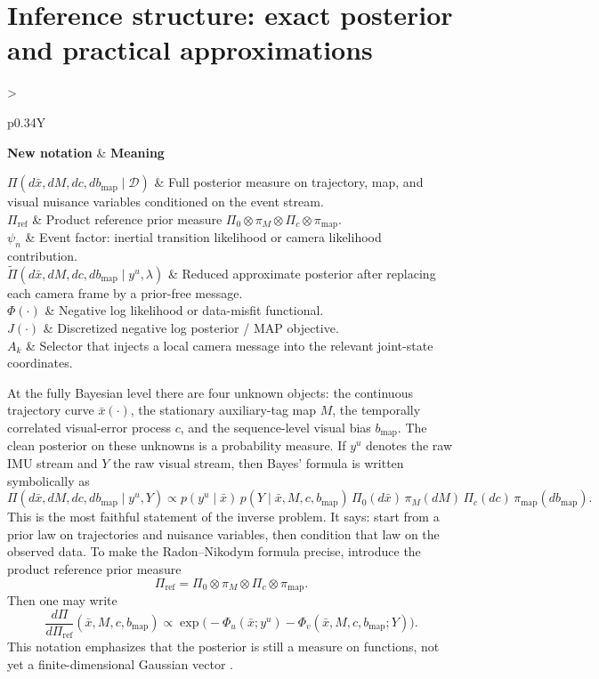 \documentclass[11pt]{report}
\newcommand{\NotationTable}[1]{%
\vspace{0.6mm}
{\scriptsize
\setlength{\tabcolsep}{2.5pt}
\begin{tabularx}{\columnwidth}{>{\raggedright\arraybackslash}p{0.34\columnwidth}Y}
\toprule
\textbf{New notation} & \textbf{Meaning}\\
\midrule
#1\\
\bottomrule
\end{tabularx}}
\vspace{0.8mm}}
\begin{document}
\section{Inference structure: exact posterior and practical approximations}
\NotationTable{
$\Pi(d\bar x,dM,dc,db_{\mathrm{map}}\mid \mathcal D)$ & Full posterior measure on trajectory, map, and visual nuisance variables conditioned on the event stream.\\
$\Pi_{\mathrm{ref}}$ & Product reference prior measure $\Pi_0\otimes\pi_M\otimes\Pi_c\otimes\pi_{\mathrm{map}}$.\\
$\psi_n$ & Event factor: inertial transition likelihood or camera likelihood contribution.\\
$\widetilde\Pi(d\bar x,dM,dc,db_{\mathrm{map}}\mid y^u,\lambda)$ & Reduced approximate posterior after replacing each camera frame by a prior-free message.\\
$\Phi(\cdot)$ & Negative log likelihood or data-misfit functional.\\
$J(\cdot)$ & Discretized negative log posterior / MAP objective.\\
$A_k$ & Selector that injects a local camera message into the relevant joint-state coordinates.}

At the fully Bayesian level there are four unknown objects: the continuous trajectory curve $\bar x(\cdot)$, the stationary auxiliary-tag map $M$, the temporally correlated visual-error process $c$, and the sequence-level visual bias $b_{\mathrm{map}}$. The clean posterior on these unknowns is a probability measure. If $y^u$ denotes the raw IMU stream and $Y$ the raw visual stream, then Bayes' formula is written symbolically as
\begin{equation}
\Pi(d\bar x,dM,dc,db_{\mathrm{map}}\mid y^u,Y)
\propto p(y^u\mid \bar x)\,p(Y\mid \bar x,M,c,b_{\mathrm{map}})\,\Pi_0(d\bar x)\,\pi_M(dM)\,\Pi_c(dc)\,\pi_{\mathrm{map}}(db_{\mathrm{map}}).
\label{eq:path_space_posterior_sweep}
\end{equation}
This is the most faithful statement of the inverse problem. It says: start from a prior law on trajectories and nuisance variables, then condition that law on the observed data. To make the Radon--Nikodym formula precise, introduce the product reference prior measure
\[
\Pi_{\mathrm{ref}}=\Pi_0\otimes\pi_M\otimes\Pi_c\otimes\pi_{\mathrm{map}}.
\]
Then one may write
\begin{equation}
\frac{d\Pi}{d\Pi_{\mathrm{ref}}}(\bar x,M,c,b_{\mathrm{map}})
\propto \exp\!\big(-\Phi_u(\bar x;y^u)-\Phi_v(\bar x,M,c,b_{\mathrm{map}};Y)\big).
\label{eq:rn_derivative_sweep}
\end{equation}
This notation emphasizes that the posterior is still a measure on functions, not yet a finite-dimensional Gaussian vector \citep{stuart2010inverse,hairer2007bayesian}.
\end{document}
